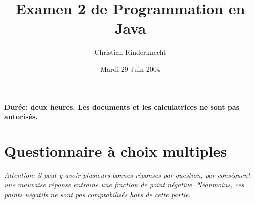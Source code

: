 \documentclass[10pt,a4paper]{article}
\title{Examen 2 de Programmation en Java}
\author{Christian Rinderknecht}
\date{Mardi 29 Juin 2004}
\begin{document}
\maketitle

\noindent
\textbf{Durée: deux heures. Les documents et les calculatrices ne sont
 pas autorisés.}

\smallskip

\section{Questionnaire à choix multiples}

\noindent \emph{Attention: il peut y avoir plusieurs bonnes réponses
  par question, par conséquent une mauvaise réponse entraine une
  fraction de point négative. Néanmoins, ces points négatifs ne sont
  pas comptabilisés hors de cette partie.}
\end{document}
